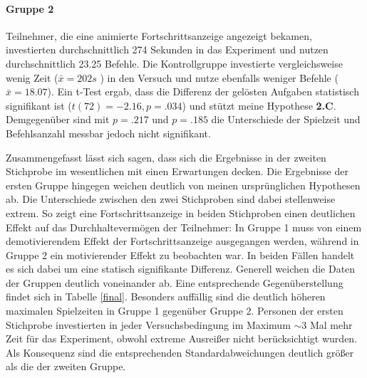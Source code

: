 \paragraph{Gruppe 2}
Teilnehmer, die eine animierte Fortschrittsanzeige angezeigt bekamen, investierten durchschnittlich 274 Sekunden in das Experiment und nutzen durchschnittlich 23.25 Befehle. Die Kontrollgruppe investierte vergleichsweise wenig Zeit ($ \bar{x} = 202s $ ) in den Versuch und nutze ebenfalls weniger Befehle ($ \bar{x} = 18.07 $). Ein t-Test ergab, dass die Differenz der gelösten Aufgaben statistisch signifikant ist ($t(72)=-2.16, p=.034$) und stützt meine Hypothese \textbf{2.C}. Demgegenüber sind mit $ p=.217 $ und $p=.185$ die Unterschiede der Spielzeit und Befehlsanzahl messbar jedoch nicht signifikant.
 
Zusammengefasst lässt sich sagen, dass sich die Ergebnisse in der zweiten Stichprobe im wesentlichen mit einen Erwartungen decken. Die Ergebnisse der ersten Gruppe hingegen weichen deutlich von meinen ursprünglichen Hypothesen ab. Die Unterschiede zwischen den zwei Stichproben sind dabei stellenweise extrem. So zeigt eine Fortschrittsanzeige in beiden Stichproben einen deutlichen Effekt auf das Durchhaltevermögen der Teilnehmer: In Gruppe 1 muss von einem demotivierendem Effekt der Fortschrittsanzeige ausgegangen werden, während in Gruppe 2 ein motivierender Effekt zu beobachten war. In beiden Fällen handelt es sich dabei um eine statisch signifikante Differenz. Generell weichen die Daten der Gruppen deutlich voneinander ab. Eine entsprechende Gegenüberstellung findet sich in Tabelle \ref{final}. Besonders auffällig sind die deutlich höheren maximalen Spielzeiten in Gruppe 1 gegenüber Gruppe 2. Personen der ersten Stichprobe investierten in jeder Versuchsbedingung im Maximum $\sim3$ Mal mehr Zeit für das Experiment, obwohl extreme Ausreißer nicht berücksichtigt wurden. Als Konsequenz sind die entsprechenden Standardabweichungen deutlich größer als die der zweiten Gruppe.


